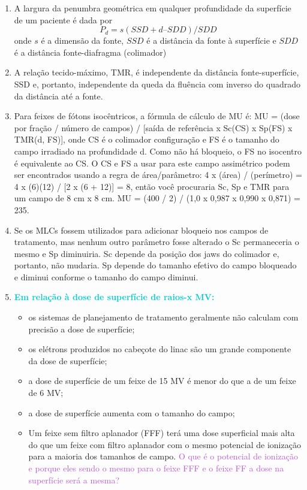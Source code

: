 \documentclass[11pt,a4paper]{article}
\begin{document}
\begin{enumerate}
        \item A largura da penumbra geométrica em qualquer profundidade da superfície de um paciente é dada por$$ P_d = s (SSD + d – SDD) / SDD$$ onde $s$ é a dimensão da fonte, $SSD$ é a distância da fonte à superfície e $SDD$ é a distância fonte-diafragma (colimador)

        \item A relação tecido-máximo, TMR, é independente da distância fonte-superfície, SSD e, portanto, independente da queda da fluência com inverso do quadrado da distância até a fonte.

        \item Para feixes de fótons isocêntricos, a fórmula de cálculo de MU é: MU = (dose por fração / número de campos) / [saída de referência x Sc(CS) x Sp(FS) x TMR(d, FS)], onde CS é o colimador configuração e FS é o tamanho do campo irradiado na profundidade d. Como não há bloqueio, o FS no isocentro é equivalente ao CS. O CS e FS a usar para este campo assimétrico podem ser encontrados usando a regra de área/parâmetro: 4 x (área) / (perímetro) = 4 x (6)(12) / [2 x (6 + 12)] = 8, então você procuraria Sc, Sp e TMR para um campo de 8 cm x 8 cm. MU = (400 / 2) / (1,0 x 0,987 x 0,990 x 0,871) = 235.
        
        \item Se os MLCs fossem utilizados para adicionar bloqueio nos campos de tratamento, mas nenhum outro parâmetro fosse alterado o Sc permaneceria o mesmo e Sp diminuiria. Sc depende da posição dos jaws do colimador e, portanto, não mudaria. Sp depende do tamanho efetivo do campo bloqueado e diminui conforme o tamanho do campo diminui.

        \item \textcolor{DarkTurquoise}{\textbf{Em relação à dose de superfície de raios-x MV:}}
            \begin{itemize}[label=\textcolor{CarnationPink}{$\star$}]
                \item os sistemas de planejamento de tratamento geralmente não calculam com precisão a dose de superfície;
                \item os elétrons produzidos no cabeçote do linac são um grande componente da dose de superfície;
                \item a dose de superfície de um feixe de 15 MV é menor do que a de um feixe de 6 MV;
                \item a dose de superfície aumenta com o tamanho do campo;
                \item Um feixe sem filtro aplanador (FFF) terá uma dose superficial mais alta do que um feixe com filtro aplanador com o mesmo potencial de ionização para a maioria dos tamanhos de campo. \textcolor{MediumOrchid}{O que é o potencial de ionização e porque eles sendo o mesmo para o feixe FFF e o feixe FF a dose na superfície será a mesma?}
            \end{itemize}


\end{enumerate}
\end{document}
